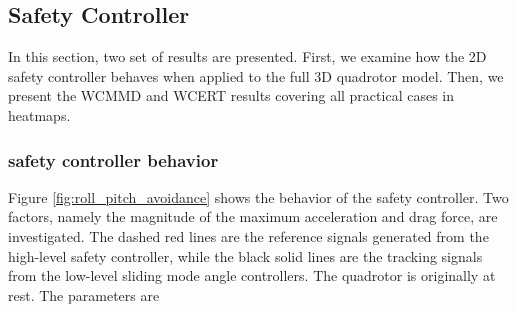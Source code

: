 \documentclass[journal,11pt,onecolumn,draftclsnofoot,]{IEEEtran}
\begin{document}
%
%
%

\subsection{Safety Controller} \label{sec:safety_controller_result}

In this section, two set of results are presented. First, we examine how the 2D safety controller behaves when applied to the full 3D quadrotor model. Then, we present the WCMMD and WCERT results covering all practical cases in heatmaps. 

\subsubsection{safety controller behavior}

Figure \ref{fig:roll_pitch_avoidance} shows the behavior of the safety controller. Two factors, namely the magnitude of the maximum acceleration and drag force, are investigated. The dashed red lines are the reference signals generated from the high-level safety controller, while the black solid lines are the tracking signals from the low-level sliding mode angle controllers. The quadrotor is originally at rest. The parameters are
\end{document}
